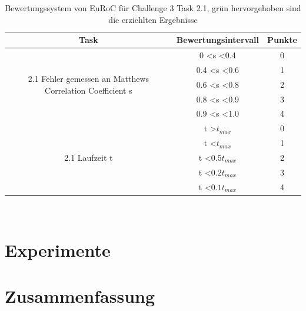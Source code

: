 \documentclass[12pt,titlepage, a4paper]{article}
\begin{document}
\begin{table}
\centering
\begin{tabular}{c|c|c}
Task & Bewertungsintervall & Punkte\\
\hline
\multirow{5}{210pt}{2.1 Fehler gemessen an Matthews Correlation Coefficient s} & 0 \textless s \textless 0.4 & 0 \\
 & 0.4 \textless  s \textless 0.6 & 1\\  
  & 0.6 \textless  s \textless 0.8 & 2\\
 & \cellcolor{green!10.0}0.8 \textless  s \textless 0.9 &\cellcolor{green!10.0} 3\\
 & 0.9 \textless  s \textless 1.0 & 4\\
\hline
\multirow{5}{210pt}{2.1 Laufzeit t} & t \textgreater $t_{max}$ & 0 \\
 & t \textless $t_{max}$ & 1\\  
  &\cellcolor{green!10.0} t \textless $0.5 t_{max}$ &\cellcolor{green!10.0} 2\\
  & t \textless $0.2 t_{max}$ & 3\\
 & t \textless $0.1 t_{max}$ & 4\\
\hline
\end{tabular}\\
\vspace{10mm}
\caption{Bewertungssystem von EuRoC für Challenge 3 Task 2.1, grün hervorgehoben sind die erziehlten Ergebnisse}
\label{table:scoringt2}
\end{table}

\section{Experimente}

\section{Zusammenfassung}

  
  
\end{document}
